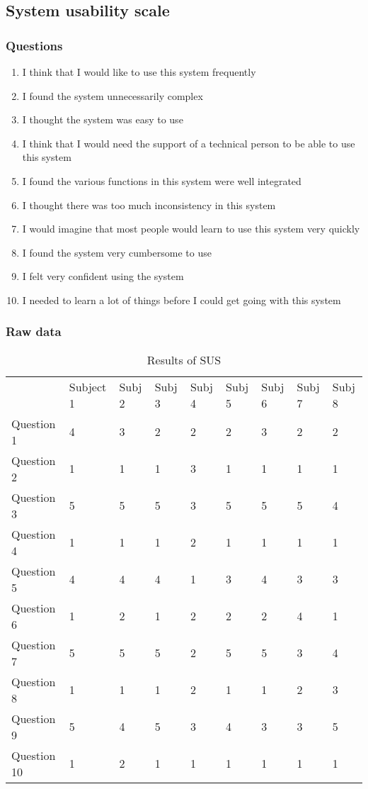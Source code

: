 \subsection{System usability scale}
\label{appendix:susvalues}

\subsubsection{Questions}
\begin{enumerate}
    \item I think that I would like to use this system frequently
    \item I found the system unnecessarily complex
    \item I thought the system was easy to use
    \item I think that I would need the support of a technical person to be able to use this system
    \item I found the various functions in this system were well integrated
    \item I thought there was too much inconsistency in this system 
    \item I would imagine that most people would learn to use this system very quickly
    \item I found the system very cumbersome to use
    \item I felt very confident using the system
    \item I needed to learn a lot of things before I could get going with this system
\end{enumerate}

\subsubsection{Raw data}
\begin{table}[H]
    \label{sustable}
    \begin{tabular}{lllllllll}
    & Subject 1 & Subj 2 & Subj 3 & Subj 4 & Subj 5 & Subj 6 & Subj 7 & Subj 8 \\
    Question 1  & 4   & 3   & 2   & 2   & 2   & 3   & 2   & 2   \\
    Question 2  & 1   & 1   & 1   & 3   & 1   & 1   & 1   & 1   \\
    Question 3  & 5   & 5   & 5   & 3   & 5   & 5   & 5   & 4   \\
    Question 4  & 1   & 1   & 1   & 2   & 1   & 1   & 1   & 1   \\
    Question 5  & 4   & 4   & 4   & 1   & 3   & 4   & 3   & 3   \\
    Question 6  & 1   & 2   & 1   & 2   & 2   & 2   & 4   & 1   \\
    Question 7  & 5   & 5   & 5   & 2   & 5   & 5   & 3   & 4   \\
    Question 8  & 1   & 1   & 1   & 2   & 1   & 1   & 2   & 3   \\
    Question 9  & 5   & 4   & 5   & 3   & 4   & 3   & 3   & 5   \\
    Question 10 & 1   & 2   & 1   & 1   & 1   & 1   & 1   & 1  
    \end{tabular}
    \caption{Results of SUS}
\end{table}